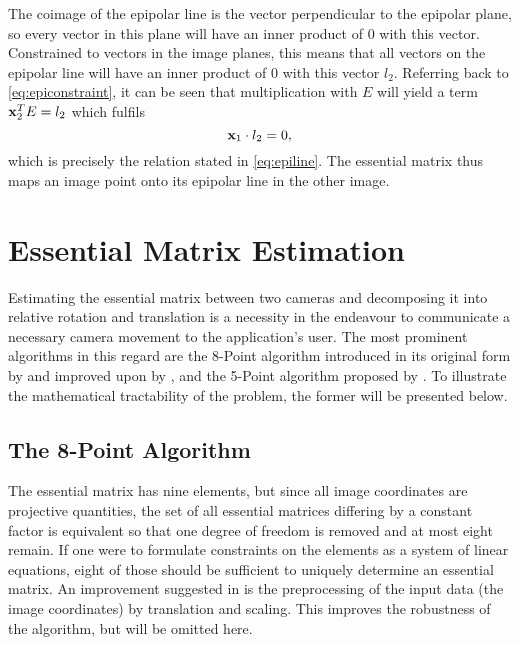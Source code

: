 The coimage of the epipolar line is the vector perpendicular to the epipolar plane,
so every vector in this plane will have an inner product of $0$ with this
vector. Constrained to vectors in the image planes, this means that all vectors on the
epipolar line will have an inner product of $0$ with this vector $l_2$.
Referring back to \eqref{eq:epiconstraint}, it can be seen that multiplication
with $E$ will yield a term $\mathbf{x}_2^TE = l_2$ which fulfils 
\begin{equation}
   \mathbf{x}_1 \cdot l_2 = 0,
\end{equation}
which is precisely the relation stated in \eqref{eq:epiline}. The essential
matrix thus maps an image point onto its epipolar line in the other image.

\section{Essential Matrix Estimation}

Estimating the essential matrix between two
cameras and decomposing it into relative rotation and translation is a necessity
in the endeavour to communicate a necessary camera movement to the application's
user. The most prominent algorithms in this regard are the 8-Point algorithm
introduced in its original form by \citet{longuet-higgins1987} and improved upon
by \citet{hartley1997}, and the 5-Point algorithm proposed by
\citet{nister2004}. To illustrate the mathematical tractability of the problem,
the former will be presented below.

\subsection{The 8-Point Algorithm}\label{sec:eight-point}

The essential matrix has nine elements, but since all image coordinates are
projective quantities, the set of all essential matrices differing by a constant
factor is equivalent so that one degree of freedom is removed and at most eight
remain. If one were to formulate constraints on the elements as a system of
linear equations, eight of those should be sufficient to uniquely determine an
essential matrix. An improvement suggested in \citep{hartley1997} is the
preprocessing of the input data (the image coordinates) by translation and
scaling. This improves the robustness of the algorithm, but will be omitted
here.

